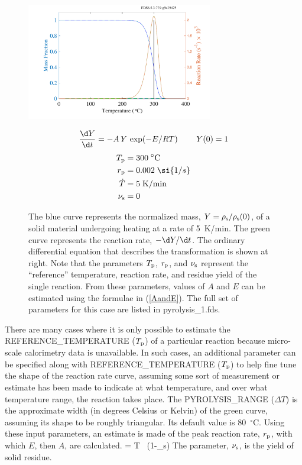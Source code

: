 \documentclass[11pt]{book}
\begin{document}
\begin{figure}[ht]
\noindent
\begin{minipage}{0.5\textwidth}
\includegraphics[width=3.2in]{SCRIPT_FIGURES/pyrolysis_1}
\end{minipage}
\hfill
\begin{minipage}{0.5\textwidth}
\begin{equation*}
   \frac{\d Y}{\d t} = -A \, Y \, \exp(-E/RT)   \quad \; \quad    Y(0) =1
\end{equation*}
\begin{align*}
   T_{\rm p} &= 300 \; ^\circ\mathrm{C}  \\
   r_{\rm p} &= 0.002   \; \si{1/s}  \\
   \dot{T} &= 5 \; \mathrm{K/min} \\
   \nu_{\rm s} &= 0 \\
\end{align*}
\end{minipage}
\caption[Simple demonstration of the pyrolysis model]{The blue curve represents the normalized mass, $Y=\rho_{\rm s}/\rho_{\rm s}(0)$, of a solid material
undergoing heating at a rate of 5~K/min. The green curve represents the reaction rate, $-\d Y/\d t$. The ordinary differential equation that describes the transformation is shown at right. Note that the parameters $T_{\rm p}$, $r_{\rm p}$, and $\nu_{\rm s}$ represent the ``reference'' temperature,
reaction rate, and residue yield of the single reaction. From these parameters, values of $A$ and $E$ can be estimated using
the formulae in (\ref{AandE}). The full set of parameters for this case are listed in {\ct pyrolysis\_1.fds}.}
\label{pyrolysis}
\end{figure}

There are many cases where it is only possible to estimate the {\ct REFERENCE\_TEMPERATURE} ($T_{\rm p}$) of a particular reaction because micro-scale calorimetry data is unavailable. In such cases, an additional parameter can be specified along with {\ct REFERENCE\_TEMPERATURE} ($T_{\rm p}$) to help fine tune the shape of the reaction rate curve, assuming some sort of measurement or estimate has been made to indicate at what temperature, and over what
temperature range, the reaction takes place. The {\ct PYROLYSIS\_RANGE} ($\Delta T$) is the approximate width (in degrees Celsius or Kelvin) of the green curve, assuming its shape to be roughly triangular. Its default value is 80~$^\circ$C. Using these input parameters, an estimate is made of the peak reaction rate, $r_{\rm p}$, with which $E$, then $A$, are calculated.
\be
    =  {\Delta T} \, (1-\nu_{\rm s}) \label{r_p}
\ee
The parameter, $\nu_{\rm s}$, is the yield of solid residue.
\end{document}
